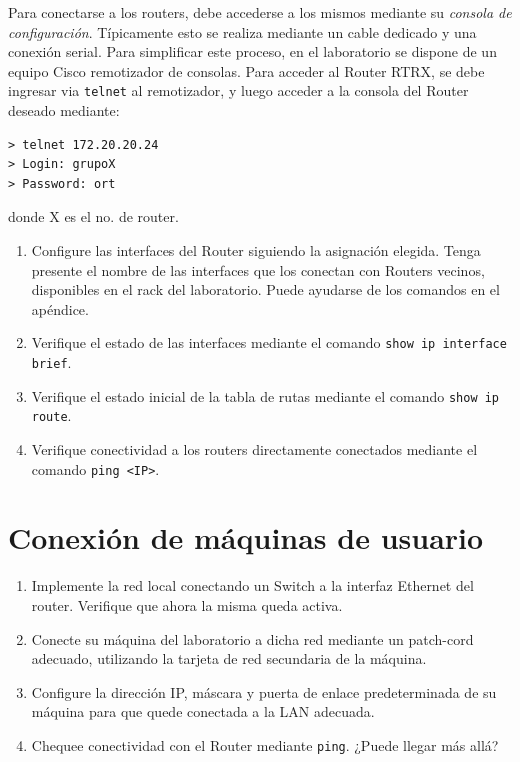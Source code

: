 \documentclass[a4paper,10pt]{article}
\begin{document}
Para conectarse a los routers, debe accederse a los mismos mediante su \emph{consola de configuración}. Típicamente esto se realiza mediante un cable dedicado y una conexión serial. Para simplificar este proceso, en el laboratorio se dispone de un equipo Cisco remotizador de consolas. Para acceder al Router RTRX, se debe ingresar via \texttt{telnet} al remotizador, y luego acceder a la consola del Router deseado mediante:
\begin{verbatim}
> telnet 172.20.20.24
> Login: grupoX
> Password: ort
\end{verbatim}
donde X es el no. de router.

\begin{enumerate}
    \item Configure las interfaces del Router siguiendo la asignación elegida. Tenga presente el nombre de las interfaces que los conectan con Routers vecinos, disponibles en el rack del laboratorio. Puede ayudarse de los comandos en el apéndice.
    \item Verifique el estado de las interfaces mediante el comando \texttt{show ip interface brief}.
    \item Verifique el estado inicial de la tabla de rutas mediante el comando \texttt{show ip route}.
    \item Verifique conectividad a los routers directamente conectados mediante el comando \texttt{ping <IP>}.
\end{enumerate}

\section{Conexión de máquinas de usuario}

\begin{enumerate}
    \item Implemente la red local conectando un Switch a la interfaz Ethernet del router. Verifique que ahora la misma queda activa.
    \item Conecte su máquina del laboratorio a dicha red mediante un patch-cord adecuado, utilizando la tarjeta de red secundaria de la máquina.
    \item Configure la dirección IP, máscara y puerta de enlace predeterminada de su máquina para que quede conectada a la LAN adecuada.
    \item Chequee conectividad con el Router mediante \texttt{ping}. ¿Puede llegar más allá?
\end{enumerate}
\end{document}
